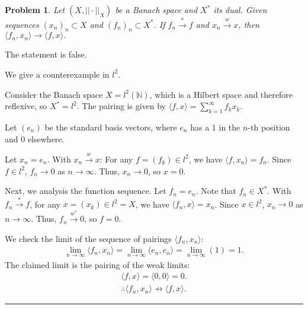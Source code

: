 \documentclass{article}
\newtheorem{problem}{Problem}
\begin{document}
\begin{problem}
    Let $(X,||\cdot||_{X})$ be a Banach space and $X^{*}$ its dual. Given sequences $(x_{n})_{n} \subset X$ and $(f_{n})_{n} \subset X^{*}$. If $f_{n} \xrightarrow{*} f$ and $x_{n}\xrightarrow{w} x$, then $\langle f_{n},x_{n}\rangle\rightarrow\langle f,x\rangle.$
\end{problem}

\vspace{0.5em}

The statement is false.

We give a counterexample in $l^2$.

Consider the Banach space $X = l^2(\mathbb{N})$, which is a Hilbert space and therefore reflexive, so $X^* = l^2$.
The pairing is given by $\langle f, x \rangle = \sum_{k=1}^\infty f_k x_k$.

Let $(e_n)$ be the standard basis vectors, where $e_n$ has a $1$ in the $n$-th position and $0$ elsewhere.

Let $x_n = e_n$.
With $x_{n}\xrightarrow{w} x$: For any $f = (f_k) \in l^2$, we have $\langle f, x_n \rangle = f_n$. Since $f \in l^2$, $f_n \rightarrow 0$ as $n \rightarrow \infty$.
Thus, $x_n \to 0$, so $x = 0$.

Next, we analysis the function sequence.
Let $f_n = e_n$. Note that $f_n \in X^*$.
With $f_{n} \xrightarrow{*} f$, for any $x = (x_k) \in l^2 = X$, we have $\langle f_n, x \rangle = x_n$. Since $x \in l^2$, $x_n \rightarrow 0$ as $n \rightarrow \infty$.
Thus, $f_n \stackrel{w^*}{\rightarrow} 0$, so $f = 0$.


We check the limit of the sequence of pairings $\langle f_{n}, x_{n} \rangle$:
\begin{align}
    \lim_{n\to\infty} \langle f_{n}, x_{n} \rangle = \lim_{n\to\infty} \langle e_n, e_n \rangle = \lim_{n\to\infty} (1) = 1.
\end{align}
The claimed limit is the pairing of the weak limits:
\begin{align}
    \langle f, x \rangle = \langle 0, 0 \rangle = 0.
    \\
    \therefore
    \langle f_{n}, x_{n} \rangle \not\rightarrow \langle f, x \rangle.
\end{align}


\hrule
\vspace{0.5em}
\end{document}
